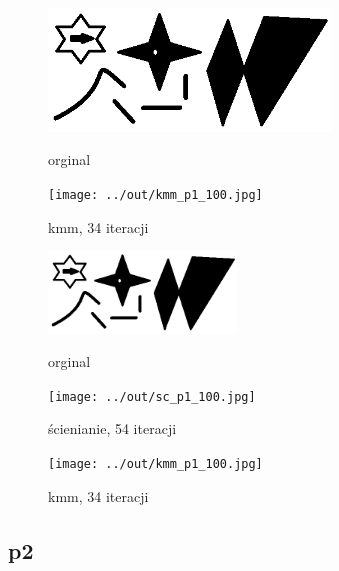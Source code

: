 \documentclass[a4paper,12pt]{article}
\begin{document}
\begin{figure}[h!]
\begin{minipage}[t]{7.5cm}
\begin{center}
\includegraphics[width=7.5cm]{../in/p1.jpg}
\caption{orginal}
\end{center}
\end{minipage}
\hfill
\begin{minipage}[t]{7.5cm}
\begin{center}
\texttt{[image: ../out/kmm\_p1\_100.jpg]}
\caption{kmm, 34 iteracji}
\end{center}
\end{minipage}
\end{figure}

\begin{figure}[h!]
\begin{minipage}[t]{5cm}
\begin{center}
\includegraphics[width=5cm]{../in/p1.jpg}
\caption{orginal}
\end{center}
\end{minipage}
\hfill
\begin{minipage}[t]{5cm}
\begin{center}
\texttt{[image: ../out/sc\_p1\_100.jpg]}
\caption{ścienianie, 54 iteracji}
\end{center}
\end{minipage}
\hfill
\begin{minipage}[t]{5cm}
\begin{center}
\texttt{[image: ../out/kmm\_p1\_100.jpg]}
\caption{kmm, 34 iteracji}
\end{center}
\end{minipage}
\end{figure}



\newpage
\subsection{p2}
\end{document}
